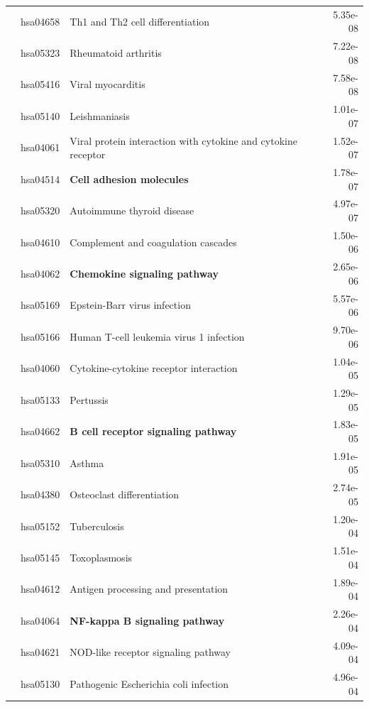 \begin{longtable}{cllr}
 & hsa04658 & \textcolor{\clrnew}{Th1 and Th2 cell differentiation} & 5.35e-08 \\ 
 \rowcolor{\clrmatch}& hsa05323 & Rheumatoid arthritis & 7.22e-08 \\ 
 \rowcolor{\clrmatch}& hsa05416 & Viral myocarditis & 7.58e-08 \\ 
 \rowcolor{\clrmatch}& hsa05140 & Leishmaniasis & 1.01e-07 \\ 
 & hsa04061 & \textcolor{\clrnew}{Viral protein interaction with cytokine and cytokine receptor} & 1.52e-07 \\ 
 \rowcolor{\clrpath}& hsa04514 & \textbf{Cell adhesion molecules} & 1.78e-07 \\ 
 \rowcolor{\clrmatch}& hsa05320 & Autoimmune thyroid disease & 4.97e-07 \\ 
 & hsa04610 & \textcolor{\clrnew}{Complement and coagulation cascades} & 1.50e-06 \\ 
 \rowcolor{\clrpath}& hsa04062 & \textbf{Chemokine signaling pathway} & 2.65e-06 \\ 
 & hsa05169 & \textcolor{\clrnew}{Epstein-Barr virus infection} & 5.57e-06 \\ 
 \rowcolor{\clrmatch}& hsa05166 & Human T-cell leukemia virus 1 infection & 9.70e-06 \\ 
 \rowcolor{\clrmatch}& hsa04060 & Cytokine-cytokine receptor interaction & 1.04e-05 \\ 
 & hsa05133 & \textcolor{\clrnew}{Pertussis} & 1.29e-05 \\ 
 \rowcolor{\clrpath}& hsa04662 & \textbf{B cell receptor signaling pathway} & 1.83e-05 \\ 
 \rowcolor{\clrmatch}& hsa05310 & Asthma & 1.91e-05 \\ 
 & hsa04380 & \textcolor{\clrnew}{Osteoclast differentiation} & 2.74e-05 \\ 
 \rowcolor{\clrmatch}& hsa05152 & Tuberculosis & 1.20e-04 \\ 
 \rowcolor{\clrmatch}& hsa05145 & Toxoplasmosis & 1.51e-04 \\ 
 \rowcolor{\clrmatch}& hsa04612 & Antigen processing and presentation & 1.89e-04 \\ 
 \rowcolor{\clrpath}& hsa04064 & \textbf{NF-kappa B signaling pathway} & 2.26e-04 \\ 
 & hsa04621 & \textcolor{\clrnew}{NOD-like receptor signaling pathway} & 4.09e-04 \\ 
 & hsa05130 & \textcolor{\clrnew}{Pathogenic Escherichia coli infection} & 4.96e-04 \\ 

\end{longtable}
